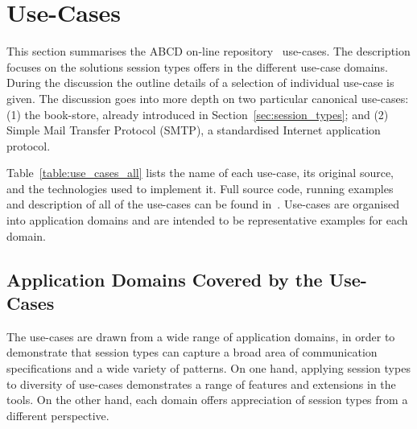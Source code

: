 
\section{Use-Cases}
\label{sec:usecases}

This section summarises the ABCD on-line
repository~\cite{usecase_repository} use-cases.
The description focuses on the
solutions session types offers in the different 
use-case domains. During the discussion
the outline details of a selection of individual
use-case is given. The discussion goes
into more depth on two particular canonical
use-cases:
(1) the book-store, %
already introduced
in Section~\ref{sec:session_types};
and
(2) Simple Mail Transfer Protocol (SMTP),
a standardised Internet application protocol.

Table~\ref{table:use_cases_all} lists the name of each use-case,
its original source, and the technologies
used to implement it. Full source code, running examples and %
description of all of the use-cases can be found in~\cite{usecase_repository}. 
Use-cases are organised into application domains and are intended
to be representative examples for each domain.

\subsection{Application Domains Covered by the Use-Cases}

The use-cases are drawn from a wide range of
application domains, in order to demonstrate that
session types can capture a broad area of communication
specifications and a wide variety of patterns.
On  one hand, applying session types to diversity of use-cases
demonstrates a range of features and extensions in the tools. 
%
On the other  hand, each domain offers appreciation
of session types from a different perspective.


